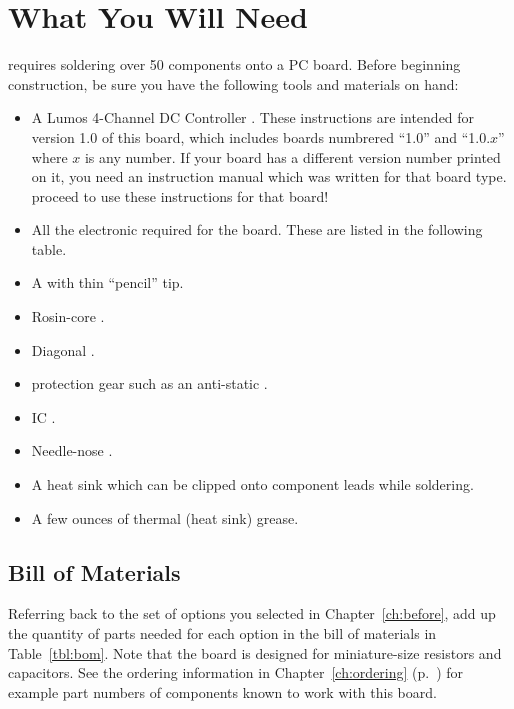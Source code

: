 \documentclass[letterpaper,twoside,onecolumn,openright,final]{memoir}
\begin{document}
\chapter{What You Will Need}\label{ch:materials}
 requires soldering over 50 components onto a PC board.
Before beginning construction, be sure you have the following tools and materials on hand:
\begin{itemize}
	\item A Lumos 4-Channel DC Controller . 
		These instructions are intended for version
		1.0 of this board, which includes boards numbrered ``1.0'' and ``1.0.$x$'' where $x$ is any
		number.  If your board has a different version number printed on it, you need an
		instruction manual which was written for that board type.   proceed to
		use these instructions for that board!
	\item All the electronic  required for the board.  These are listed in the
		following table.
	\item A  with thin ``pencil'' tip.
	\item Rosin-core .  
	\item Diagonal .
	\item {} protection gear such as an anti-static .
	\item IC .
	\item Needle-nose .
	\item A heat sink which can be clipped onto component leads while soldering.
	\item A few ounces of thermal (heat sink) grease.
\end{itemize}

\section{Bill of Materials}
Referring back to the set of options you selected in Chapter~\ref{ch:before}, add up the quantity of
parts needed for each option in the bill of materials in Table~\ref{tbl:bom}.
Note that the board is designed for miniature-size resistors and capacitors.  See the
ordering information in Chapter~\ref{ch:ordering} (p.~\pageref{ch:ordering}) for example part numbers of
components known to work with this board.
\end{document}

